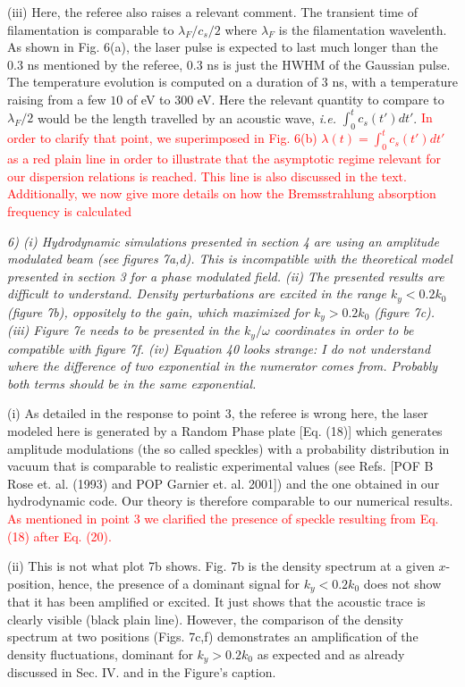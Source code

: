 \documentclass{article}
\def\tc{\textcolor{red}}
\begin{document}
(iii) Here, the referee also raises a relevant comment. The transient time of filamentation is comparable to $\lambda_F/c_s/2$ where $\lambda_F$ is the filamentation wavelenth. As shown in Fig. 6(a), the laser pulse is expected to last much longer than the 0.3 ns mentioned by the referee, 0.3 ns is just the HWHM of the Gaussian pulse. The temperature evolution is computed on a duration of 3 ns, with a temperature raising from a few $10$ of eV to $300$ eV. Here the relevant quantity to compare to $\lambda_F/2$ would be the length travelled by an acoustic wave, \emph{i.e.}  $\int_0^t c_s(t')dt'$. 
\tc{In order to clarify that point, we superimposed in Fig. 6(b) $\lambda (t) =\int_0^t c_s(t')dt'$ as a red plain line in order to illustrate that the asymptotic regime relevant for our dispersion relations is reached. This line is also discussed in the text.
Additionally, we now give more details on how the Bremsstrahlung absorption frequency is calculated}

\textit{
6) (i) Hydrodynamic simulations presented in section 4 are using an amplitude modulated beam (see figures 7a,d). This is incompatible with the theoretical model presented in section 3 for a phase modulated field. 
(ii) The presented results are difficult to understand. Density perturbations are excited in the range $k_y < 0.2 k_0$ (figure 7b), oppositely to the gain, which maximized for $k_y > 0.2 k_0$ (figure 7c). 
(iii) Figure 7e needs to be presented in the $k_y/\omega$ coordinates in order to be compatible with figure 7f. 
(iv) Equation 40 looks strange: I do not understand where the difference of two exponential in the numerator comes from. Probably both terms should be in the same exponential. }

(i) As detailed in the response to point 3,  the referee is wrong here, the laser modeled here is generated by a Random Phase plate [Eq. (18)] which generates amplitude modulations (the so called speckles) with a probability distribution in vacuum that is comparable to realistic experimental values (see Refs. [POF B Rose et. al. (1993) and POP Garnier et. al. 2001]) and the one obtained in our hydrodynamic code. Our theory is therefore comparable to our numerical results. \tc{As mentioned in point 3 we clarified the presence of speckle resulting from  Eq.  (18)  after Eq. (20).}

(ii) This is not what plot 7b shows.  Fig. 7b is the density spectrum at a given $x$-position, hence, the presence of a dominant signal for $k_y < 0.2 k_0$ does not show that it has been amplified or excited. It just shows that the acoustic trace is clearly visible (black plain line). 
However, the comparison of the density spectrum at two positions (Figs. 7c,f) demonstrates an amplification of the density fluctuations, dominant for  $k_y > 0.2 k_0$ as expected and as already discussed in Sec. IV. and in the Figure's caption. 
\end{document}
